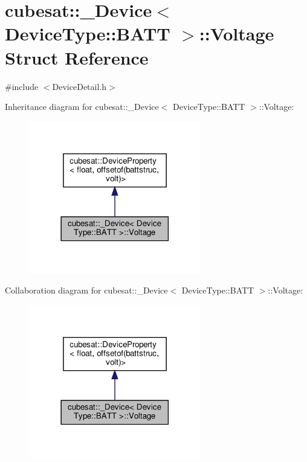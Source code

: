 \hypertarget{structcubesat_1_1__Device_3_01DeviceType_1_1BATT_01_4_1_1Voltage}{}\section{cubesat\+:\+:\+\_\+\+Device$<$ Device\+Type\+:\+:B\+A\+TT $>$\+:\+:Voltage Struct Reference}
\label{structcubesat_1_1__Device_3_01DeviceType_1_1BATT_01_4_1_1Voltage}


{\ttfamily \#include $<$Device\+Detail.\+h$>$}



Inheritance diagram for cubesat\+:\+:\+\_\+\+Device$<$ Device\+Type\+:\+:B\+A\+TT $>$\+:\+:Voltage\+:\nopagebreak
\begin{figure}[H]
\begin{center}
\leavevmode
\includegraphics[width=213pt]{structcubesat_1_1__Device_3_01DeviceType_1_1BATT_01_4_1_1Voltage__inherit__graph}
\end{center}
\end{figure}


Collaboration diagram for cubesat\+:\+:\+\_\+\+Device$<$ Device\+Type\+:\+:B\+A\+TT $>$\+:\+:Voltage\+:\nopagebreak
\begin{figure}[H]
\begin{center}
\leavevmode
\includegraphics[width=213pt]{structcubesat_1_1__Device_3_01DeviceType_1_1BATT_01_4_1_1Voltage__coll__graph}
\end{center}
\end{figure}

